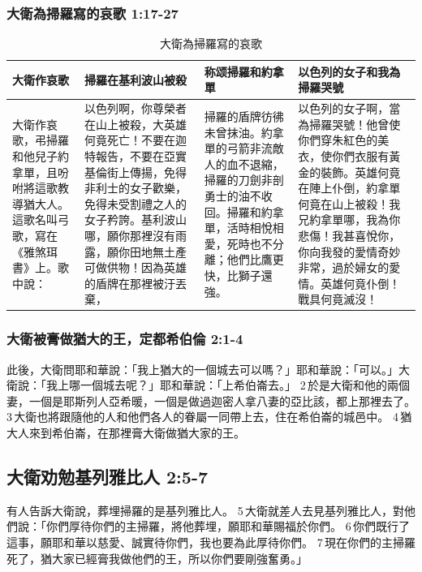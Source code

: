\subsubsection{大衛為掃羅寫的哀歌 1:17-27}
\begin{table}[H]
\centering 
\begin{tabular}{p{2.5cm}|p{4.9cm}|p{3.5cm}|p{5.5cm}}
\hline
\hline
大衛作哀歌&掃羅在基利波山被殺&称颂掃羅和約拿單&以色列的女子和我為掃羅哭號\\\hline
大衛作哀歌，弔掃羅和他兒子約拿單，且吩咐將這歌教導猶大人。這歌名叫弓歌，寫在《雅煞珥書》上。歌中說：
&以色列啊，你尊榮者在山上被殺，大英雄何竟死亡！不要在迦特報告，不要在亞實基倫街上傳揚，免得非利士的女子歡樂，免得未受割禮之人的女子矜誇。基利波山哪，願你那裡沒有雨露，願你田地無土產可做供物！因為英雄的盾牌在那裡被汙丟棄，
&掃羅的盾牌彷彿未曾抹油。約拿單的弓箭非流敵人的血不退縮，掃羅的刀劍非剖勇士的油不收回。掃羅和約拿單，活時相悅相愛，死時也不分離；他們比鷹更快，比獅子還強。 
&以色列的女子啊，當為掃羅哭號！他曾使你們穿朱紅色的美衣，使你們衣服有黃金的裝飾。英雄何竟在陣上仆倒，約拿單何竟在山上被殺！我兄約拿單哪，我為你悲傷！我甚喜悅你，你向我發的愛情奇妙非常，過於婦女的愛情。英雄何竟仆倒！戰具何竟滅沒！\\\hline
\end{tabular}
\caption{大衛為掃羅寫的哀歌}
\end{table}

\subsubsection{大衛被膏做猶大的王，定都希伯倫 2:1-4}
此後，大衛問耶和華說：「我上猶大的一個城去可以嗎？」耶和華說：「可以。」大衛說：「我上哪一個城去呢？」耶和華說：「上希伯崙去。」 2 於是大衛和他的兩個妻，一個是耶斯列人亞希暖，一個是做過迦密人拿八妻的亞比該，都上那裡去了。 3 大衛也將跟隨他的人和他們各人的眷屬一同帶上去，住在希伯崙的城邑中。 4 猶大人來到希伯崙，在那裡膏大衛做猶大家的王。

\subsection{大衛劝勉基列雅比人 2:5-7}
有人告訴大衛說，葬埋掃羅的是基列雅比人。 5 大衛就差人去見基列雅比人，對他們說：「你們厚待你們的主掃羅，將他葬埋，願耶和華賜福於你們。 6 你們既行了這事，願耶和華以慈愛、誠實待你們，我也要為此厚待你們。 7 現在你們的主掃羅死了，猶大家已經膏我做他們的王，所以你們要剛強奮勇。」

